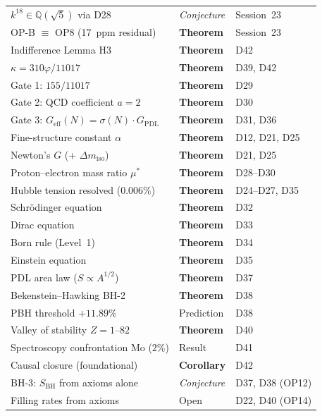 \documentclass[12pt,a4paper]{article}
\theoremstyle{plain}
\theoremstyle{definition}
\theoremstyle{remark}
\newcommand{\vp}{\varphi}
\newcommand{\kap}{\kappa}
\newcommand{\sigmaN}{\sigma(N)}
\newcommand{\GPDL}{G_{\mathrm{PDL}}}
\newcommand{\Geff}{G_{\mathrm{eff}}}
\newcommand{\SBH}{S_{\mathrm{BH}}}
\newcommand{\dmiso}{\Delta m_{\mathrm{iso}}}
\begin{document}
\begin{table}[H]
\begin{tabular}{>{\raggedright}p{7.2cm} p{2.0cm} p{5.0cm}}
$k^{18}\in\mathbb{Q}(\sqrt{5})$ via D28 & \textcolor{conjecturegreen}{\textit{Conjecture}} & Session~23 \\[2pt]
OP-B $\equiv$ OP8 (17~ppm residual) & \textcolor{proofblue}{\textbf{Theorem}} & Session~23 \\[2pt]
Indifference Lemma H3 & \textcolor{proofblue}{\textbf{Theorem}} & D42 \\[2pt]
$\kap=310\vp/11017$ & \textcolor{proofblue}{\textbf{Theorem}} & D39, D42 \\[2pt]
Gate 1: $155/11017$ & \textcolor{proofblue}{\textbf{Theorem}} & D29 \\[2pt]
Gate 2: QCD coefficient $a=2$ & \textcolor{proofblue}{\textbf{Theorem}} & D30 \\[2pt]
Gate 3: $\Geff(N)=\sigmaN\cdot\GPDL$ & \textcolor{proofblue}{\textbf{Theorem}} & D31, D36 \\[2pt]
Fine-structure constant $\alpha$ & \textcolor{proofblue}{\textbf{Theorem}} & D12, D21, D25 \\[2pt]
Newton's $G$ (+ $\dmiso$) & \textcolor{proofblue}{\textbf{Theorem}} & D21, D25 \\[2pt]
Proton--electron mass ratio $\mu^*$ & \textcolor{proofblue}{\textbf{Theorem}} & D28--D30 \\[2pt]
Hubble tension resolved ($0.006\%$) & \textcolor{proofblue}{\textbf{Theorem}} & D24--D27, D35 \\[2pt]
Schrödinger equation & \textcolor{proofblue}{\textbf{Theorem}} & D32 \\[2pt]
Dirac equation & \textcolor{proofblue}{\textbf{Theorem}} & D33 \\[2pt]
Born rule (Level~1) & \textcolor{proofblue}{\textbf{Theorem}} & D34 \\[2pt]
Einstein equation & \textcolor{proofblue}{\textbf{Theorem}} & D35 \\[2pt]
PDL area law ($S\propto A^{1/2}$) & \textcolor{proofblue}{\textbf{Theorem}} & D37 \\[2pt]
Bekenstein--Hawking BH-2 & \textcolor{proofblue}{\textbf{Theorem}} & D38 \\[2pt]
PBH threshold $+11.89\%$ & Prediction & D38 \\[2pt]
Valley of stability $Z=1$--$82$ & \textcolor{proofblue}{\textbf{Theorem}} & D40 \\[2pt]
Spectroscopy confrontation Mo ($2\%$) & Result & D41 \\[2pt]
Causal closure (foundational) & \textcolor{proofblue}{\textbf{Corollary}} & D42 \\[2pt]
BH-3: $\SBH$ from axioms alone & \textcolor{conjecturegreen}{\textit{Conjecture}} & D37, D38 (OP12) \\[2pt]
Filling rates from axioms & \textcolor{openproblemred}{Open} & D22, D40 (OP14) \\
\bottomrule
\end{tabular}
\end{table}
\end{document}
